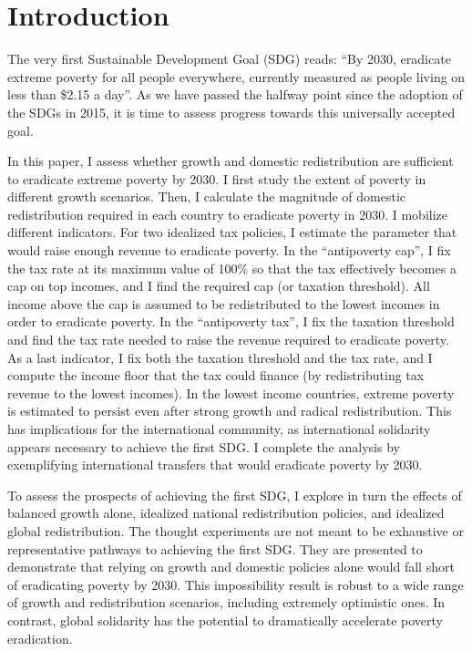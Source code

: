 
\section{Introduction}%

The very first Sustainable Development Goal (SDG) %
reads: ``By 2030, eradicate extreme poverty for all people everywhere, currently measured as people living on less than \$2.15 a day''. As we have passed the halfway point since the adoption of the SDGs in 2015, it is time to assess progress towards this universally accepted goal. 

In this paper, I assess whether growth and domestic redistribution are sufficient to eradicate extreme poverty by 2030. I first study the extent of poverty in different growth scenarios. Then, I calculate the magnitude of domestic redistribution required in each country to eradicate poverty in 2030. I mobilize different indicators. For two idealized tax policies, I estimate the parameter that would raise enough revenue to eradicate poverty. In the ``antipoverty cap'', I fix the tax rate at its maximum value of 100\% so that the tax effectively becomes a cap on top incomes, and I find the required cap (or taxation threshold). All income above the cap is assumed to be redistributed to the lowest incomes in order to eradicate poverty. In the ``antipoverty tax'', I fix the taxation threshold and find the tax rate needed to raise the revenue required to eradicate poverty. As a last indicator, I fix both the taxation threshold and the tax rate, and I compute the income floor that the tax could finance (by redistributing tax revenue to the lowest incomes). In the lowest income countries, extreme poverty is estimated to persist even after strong growth and radical redistribution. %
This has implications for the international community, as international solidarity appears necessary to achieve the first SDG. I complete the analysis by exemplifying international transfers that would eradicate poverty by 2030.

To assess the prospects of achieving the first SDG, I explore in turn the effects of balanced growth alone, idealized national redistribution policies, and idealized global redistribution. The thought experiments are not meant to be exhaustive or representative pathways to achieving the first SDG. They are presented to demonstrate that relying on growth and domestic policies alone would fall short of eradicating poverty by 2030. This impossibility result is robust to a wide range of growth and redistribution scenarios, including extremely optimistic ones. In contrast, global solidarity has the potential to dramatically accelerate poverty eradication.

